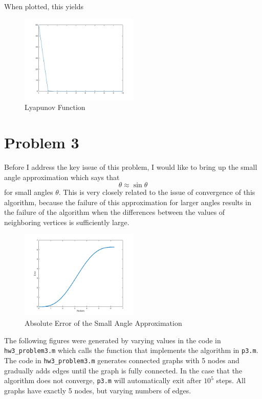 \documentclass{article}
\begin{document}
When plotted, this yields
\begin{figure}[h!]
\centering
\caption{Lyapunov Function}
\includegraphics[width=0.5\textwidth]{p2plot.png}
\end{figure}

\section*{Problem 3}
Before I address the key issue of this problem, I would like to bring up the
small angle approximation which says that 
\[ \theta \approx \sin \theta \]
for small angles $\theta$. This is very closely related to the issue of
convergence of this algorithm, because the failure of this approximation for
larger angles results in the failure of the algorithm when the differences
between the values of neighboring vertices is sufficiently large.
\begin{figure}[h!]
\centering
\caption{Absolute Error of the Small Angle Approximation}
\includegraphics[width=0.5\textwidth]{saa-error.png}
\end{figure}
The following
figures were generated by varying values in the code in \texttt{hw3\_problem3.m}
which calls the function that implements the algorithm in \texttt{p3.m}. The
code in \texttt{hw3\_problem3.m} generates connected graphs with 5 nodes and
gradually adds edges until the graph is fully connected. In the case that the
algorithm does not converge, \texttt{p3.m} will automatically exit after
$10^{5}$ steps. All graphs have exactly 5 nodes, but varying numbers of edges. 
\end{document}
